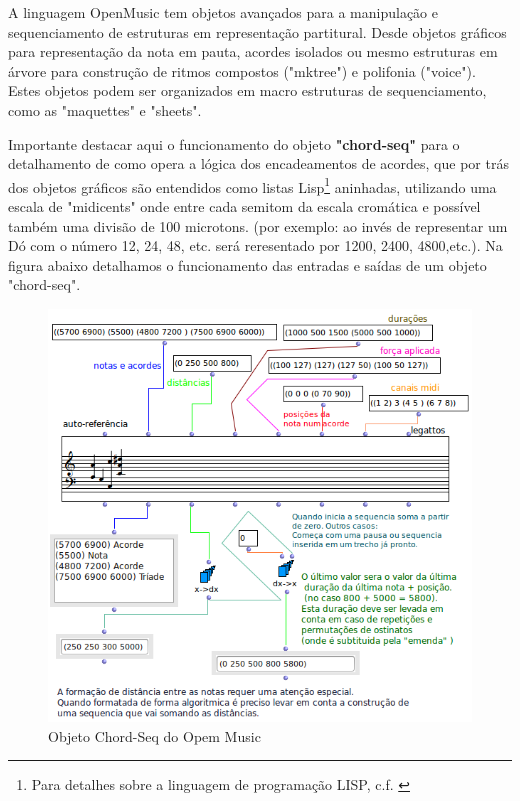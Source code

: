 \documentclass[
	12pt,				%
	openright,			%
	twoside,			%
	a4paper,			%
	english,			%
	french,				%
	spanish,			%
	brazil				%
	]{abntex2}
\begin{document}
A linguagem OpenMusic tem objetos avançados para a manipulação e sequenciamento de estruturas em representação partitural. Desde objetos gráficos para representação da nota em pauta, acordes isolados ou mesmo estruturas em árvore para construção de ritmos compostos ("mktree") e polifonia ("voice"). Estes objetos podem ser organizados em macro estruturas de sequenciamento, como as "maquettes" e "sheets"\cite{bresson2008scores}.

Importante destacar aqui o funcionamento do objeto \textbf{"chord-seq"}  para o detalhamento de como opera a lógica dos encadeamentos de acordes, que por trás dos objetos gráficos são entendidos como listas Lisp\footnote{ Para detalhes sobre a linguagem de programação LISP, c.f. \cite{graham1995ansi}} aninhadas, utilizando uma escala de "midicents" onde entre cada semitom da escala cromática e possível também uma divisão de 100 microtons. (por exemplo: ao invés de representar um Dó com o número 12, 24, 48, etc. será reresentado por 1200, 2400, 4800,etc.). Na figura abaixo detalhamos o funcionamento das entradas e saídas de um objeto "chord-seq".

\begin{figure}[!h]
	\caption{\label{fig_grafico}Objeto Chord-Seq do Opem Music}
	\begin{center}
	    \includegraphics[scale=0.7]{OMPD/chord-seq-sem-titulo.png}
	\end{center}
\end{figure}
\end{document}
